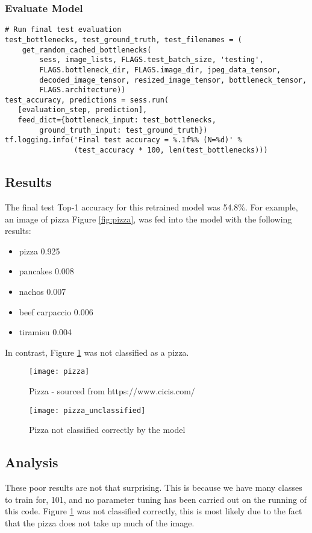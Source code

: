\subsubsection*{Evaluate Model}
\begin{lstlisting}[style=Python]
# Run final test evaluation
test_bottlenecks, test_ground_truth, test_filenames = (
    get_random_cached_bottlenecks(
        sess, image_lists, FLAGS.test_batch_size, 'testing',
        FLAGS.bottleneck_dir, FLAGS.image_dir, jpeg_data_tensor,
        decoded_image_tensor, resized_image_tensor, bottleneck_tensor,
        FLAGS.architecture))
test_accuracy, predictions = sess.run(
   [evaluation_step, prediction],
   feed_dict={bottleneck_input: test_bottlenecks,
        ground_truth_input: test_ground_truth})
tf.logging.info('Final test accuracy = %.1f%% (N=%d)' %
                (test_accuracy * 100, len(test_bottlenecks)))
\end{lstlisting}

\subsection*{Results}
The final test Top-1 accuracy for this retrained model was 54.8\%.
For example, an image of pizza Figure \ref{fig:pizza}, was fed into the model with the following results:
\begin{itemize}
    \item{pizza 0.925}
    \item{pancakes 0.008}
    \item{nachos 0.007}
    \item{beef carpaccio 0.006}
    \item{tiramisu 0.004}
\end{itemize}
In contrast, Figure \ref{fig:pizza_unclassified} was not classified as a pizza.

\begin{figure}[h] 
\centering
  \label{pizzas} 
  \begin{minipage}[h]{0.5\linewidth}
    \centering
    \texttt{[image: pizza]} 
    \caption{Pizza - sourced from https://www.cicis.com/} 
  \label{fig:pizza}
    \vspace{4ex}
  \end{minipage}%
  \begin{minipage}[h]{0.5\linewidth}
    \centering
    \texttt{[image: pizza\_unclassified]} 
    \caption{Pizza not classified correctly by the model} 
  \label{fig:pizza_unclassified}
    \vspace{4ex}
  \end{minipage} 
\end{figure}

\subsection*{Analysis}
These poor results are not that surprising.
This is because we have many classes to train for, 101, and no parameter tuning has been carried out on the running of this code.
Figure \ref{fig:pizza_unclassified} was not classified correctly, this is most likely due to the fact that the pizza does not take up much of the image.


